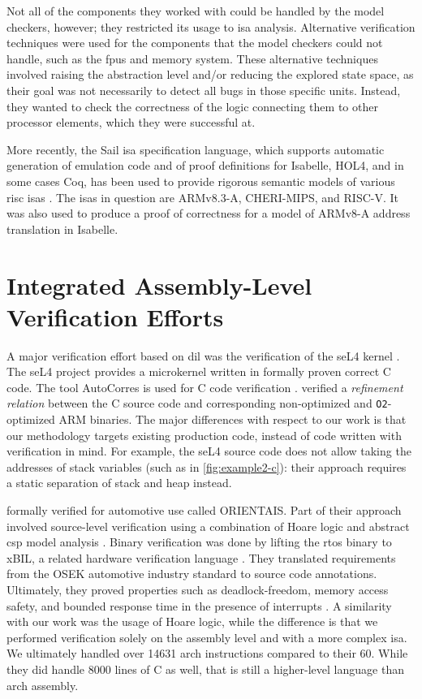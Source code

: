 Not all of the components they worked with could be handled by the model checkers,
however; they restricted its usage to \ac{isa} analysis.
Alternative verification techniques were used for the components that the model checkers
could not handle, such as the \acp{fpu} and memory system.
These alternative techniques involved raising the abstraction level
and/or reducing the explored state space,
as their goal was not necessarily to detect all bugs in those specific units.
Instead, they wanted to check the correctness of the logic connecting them
to other processor elements, which they were successful at.

More recently, the Sail \ac{isa} specification language,
which supports automatic generation of emulation code
and of proof definitions for Isabelle, HOL4, and in some cases Coq,
has been used to provide rigorous semantic models of various \ac{risc} \acp{isa}
\autocite{armstrong2018models,armstrong2019isa}.
The \acp{isa} in question are ARMv8.3-A, CHERI-MIPS, and RISC-V.
It was also used to produce a proof of correctness for a model of
ARMv8-A address translation in Isabelle.

\section{Integrated Assembly-Level Verification Efforts}\label{se:integrated_assembly}
A major verification effort based on \acl{dil}
was the verification of the seL4 kernel \autocite{klein2009sel4,Klein_AEMSKH_14}.
The seL4 project provides a microkernel written in formally proven correct C code.
The tool AutoCorres is used for C code verification \autocite{greenaway2012bridging}.
\textcite{sewell2013tvv} verified a \emph{refinement relation} between the C source code
and corresponding non-optimized and \lstinline|O2|-optimized ARM binaries.
The major differences with respect to our work
is that our methodology targets existing production code,
instead of code written with verification in mind.
For example, the seL4 source code does not allow taking the addresses of stack variables
(such as in \cref{fig:example2-c}):
their approach requires a static separation of stack and heap instead.

\textcite{shi2012orientais} formally verified  for automotive use
called ORIENTAIS.
Part of their approach involved source-level verification
using a combination of Hoare logic
and abstract \ac{csp} model analysis \autocite{hoare1978csp}.
Binary verification was done by lifting the \ac{rtos} binary to xBIL,
a related hardware verification language \autocite{shi2012xbil}.
They translated requirements from the OSEK automotive industry standard
to source code annotations.
Ultimately, they proved properties such as deadlock-freedom, memory access safety,
and bounded response time in the presence of interrupts \autocite{shi2012interrupt}.
A similarity with our work was the usage of Hoare logic,
while the difference is that we performed verification solely on the assembly level
and with a more complex \ac{isa}.
We ultimately handled over \num{14631} \gls{arch} instructions compared to their \num{60}.
While they did handle \num{8000} lines of C as well,
that is still a higher-level language than \gls{arch} assembly.

